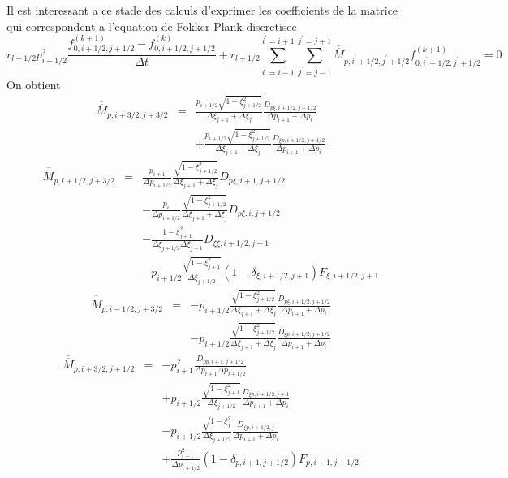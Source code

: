 Il est interessant a ce stade des calculs d'exprimer les coefficients
de la matrice qui correspondent a l'equation de Fokker-Plank discretisee
\[
r_{l+1/2}p_{i+1/2}^{2}\frac{f_{0,i+1/2,j+1/2}^{\left(k+1\right)}-f_{0,i+1/2,j+1/2}^{\left(k\right)}}{\Delta t}+r_{l+1/2}\sum_{i^{\prime}=i-1}^{i^{\prime}=i+1}\sum_{j^{\prime}=j-1}^{j^{\prime}=j+1}\overline{\overline{M}}_{p,i^{\prime}+1/2,j^{\prime}+1/2}f_{0,i^{\prime}+1/2,j^{\prime}+1/2}^{(k+1)}=0\]
 On obtient \begin{eqnarray*}
\overline{\overline{M}}_{p,i+3/2,j+3/2} & = & \frac{p_{i+1/2}\sqrt{1-\xi_{j+1/2}^{2}}}{\Delta\xi_{j+1}+\Delta\xi_{j}}\frac{D_{p\xi,i+1/2,j+1/2}}{\Delta p_{i+1}+\Delta p_{i}}\\
 &  & +\frac{p_{i+1/2}\sqrt{1-\xi_{j+1/2}^{2}}}{\Delta\xi_{j+1}+\Delta\xi_{j}}\frac{D_{\xi p,i+1/2,j+1/2}}{\Delta p_{i+1}+\Delta p_{i}}\end{eqnarray*}
\begin{eqnarray*}
\overline{\overline{M}}_{p,i+1/2,j+3/2} & = & \frac{p_{i+1}}{\Delta p_{i+1/2}}\frac{\sqrt{1-\xi_{j+1/2}^{2}}}{\Delta\xi_{j+1}+\Delta\xi_{j}}D_{p\xi,i+1,j+1/2}\\
 &  & -\frac{p_{i}}{\Delta p_{i+1/2}}\frac{\sqrt{1-\xi_{j+1/2}^{2}}}{\Delta\xi_{j+1}+\Delta\xi_{j}}D_{p\xi,i,j+1/2}\\
 &  & -\frac{1-\xi_{j+1}^{2}}{\Delta\xi_{j+1/2}\Delta\xi_{j+1}}D_{\xi\xi,i+1/2,j+1}\\
 &  & -p_{i+1/2}\frac{\sqrt{1-\xi_{j+1}^{2}}}{\Delta\xi_{j+1/2}}\left(1-\delta_{\xi,i+1/2,j+1}\right)F_{\xi,i+1/2,j+1}\end{eqnarray*}
\begin{eqnarray*}
\overline{\overline{M}}_{p,i-1/2,j+3/2} & = & -p_{i+1/2}\frac{\sqrt{1-\xi_{j+1/2}^{2}}}{\Delta\xi_{j+1}+\Delta\xi_{j}}\frac{D_{p\xi,i+1/2,j+1/2}}{\Delta p_{i+1}+\Delta p_{i}}\\
 &  & -p_{i+1/2}\frac{\sqrt{1-\xi_{j+1/2}^{2}}}{\Delta\xi_{j+1}+\Delta\xi_{j}}\frac{D_{\xi p,i+1/2,j+1/2}}{\Delta p_{i+1}+\Delta p_{i}}\end{eqnarray*}
\begin{eqnarray*}
\overline{\overline{M}}_{p,i+3/2,j+1/2} & = & -p_{i+1}^{2}\frac{D_{pp,i+1,j+1/2}}{\Delta p_{i+1}\Delta p_{i+1/2}}\\
 &  & +p_{i+1/2}\frac{\sqrt{1-\xi_{j+1}^{2}}}{\Delta\xi_{j+1/2}}\frac{D_{\xi p,i+1/2,j+1}}{\Delta p_{i+1}+\Delta p_{i}}\\
 &  & -p_{i+1/2}\frac{\sqrt{1-\xi_{j}^{2}}}{\Delta\xi_{j+1/2}}\frac{D_{\xi p,i+1/2,j}}{\Delta p_{i+1}+\Delta p_{i}}\\
 &  & +\frac{p_{i+1}^{2}}{\Delta p_{i+1/2}}\left(1-\delta_{p,i+1,j+1/2}\right)F_{p,i+1,j+1/2}\end{eqnarray*}
